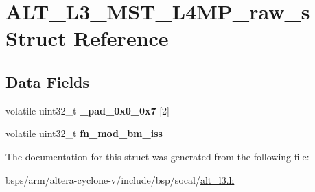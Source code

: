 \hypertarget{structALT__L3__MST__L4MP__raw__s}{}\section{A\+L\+T\+\_\+\+L3\+\_\+\+M\+S\+T\+\_\+\+L4\+M\+P\+\_\+raw\+\_\+s Struct Reference}
\label{structALT__L3__MST__L4MP__raw__s}
\subsection*{Data Fields}
\begin{DoxyCompactItemize}
\item 
\mbox{\label{structALT__L3__MST__L4MP__raw__s_aa15e1e6ac20bee1f001bddb5fb0fc6cf}} 
volatile uint32\+\_\+t {\bfseries \+\_\+pad\+\_\+0x0\+\_\+0x7} \mbox{[}2\mbox{]}
\item 
\mbox{\label{structALT__L3__MST__L4MP__raw__s_a957a52f1ffd8a835ca45ab03305c31c4}} 
volatile uint32\+\_\+t {\bfseries fn\+\_\+mod\+\_\+bm\+\_\+iss}
\end{DoxyCompactItemize}


The documentation for this struct was generated from the following file\+:\begin{DoxyCompactItemize}
\item 
bsps/arm/altera-\/cyclone-\/v/include/bsp/socal/\mbox{\hyperlink{alt__l3_8h}{alt\+\_\+l3.\+h}}\end{DoxyCompactItemize}

